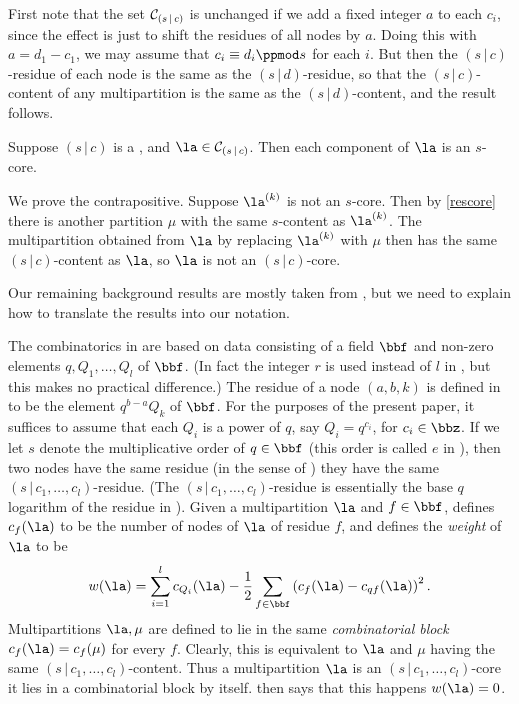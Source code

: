 \documentclass[a4paper, 11pt, twoside]{article}
\begin{document}
\begin{pf}
First note that the set $\mathcal{C}_{(s\,|\,c)}$ is unchanged if we add a fixed integer $a$ to each $c_i$, since the effect is just to shift the residues of all nodes by $a$. Doing this with $a=d_1-c_1$, we may assume that $c_i\equiv d_i\ppmod s$ for each $i$. But then the $(s\,|\,c)$-residue of each node is the same as the $(s\,|\,d)$-residue, so that the $(s\,|\,c)$-content of any multipartition is the same as the $(s\,|\,d)$-content, and the result follows.
\end{pf}

\begin{lemma}\label{multicore}
Suppose $(s\,|\,c)$ is a \mcd, and $\la\in\mc sc$. Then each component of $\la$ is an $s$-core.
\end{lemma}

\begin{pf}
We prove the contrapositive. Suppose $\cpt\la k$ is not an $s$-core. Then by \cref{rescore} there is another partition $\mu$ with the same $s$-content as $\cpt\la k$. The multipartition obtained from $\la$ by replacing $\cpt\la k$ with $\mu$ then has the same $(s\,|\,c)$-content as $\la$, so $\la$ is not an $(s\,|\,c)$-core.
\end{pf}

Our remaining background results are mostly taken from \cite{mfwt}, but we need to explain how to translate the results into our notation.

The combinatorics in \cite{mfwt} are based on data consisting of a field $\bbf$ and non-zero elements $q,Q_1,\dots,Q_l$ of $\bbf$. (In fact the integer $r$ is used instead of $l$ in \cite{mfwt}, but this makes no practical difference.) The residue of a node $(a,b,k)$ is defined in \cite{mfwt} to be the element $q^{b-a}Q_k$ of $\bbf$. For the purposes of the present paper, it suffices to assume that each $Q_i$ is a power of $q$, say $Q_i=q^{c_i}$, for $c_i\in\bbz$. If we let $s$ denote the multiplicative order of $q\in\bbf$ (this order is called $e$ in \cite{mfwt}), then two nodes have the same residue (in the sense of \cite{mfwt}) \iff they have the same $(s\,|\,c_1,\dots,c_l)$-residue. (The $(s\,|\,c_1,\dots,c_l)$-residue is essentially the base $q$ logarithm of the residue in \cite{mfwt}). Given a multipartition $\la$ and $f\in\bbf$, \cite{mfwt} defines $c_f(\la)$ to be the number of nodes of $\la$ of residue $f$, and defines the \emph{weight} of $\la$ to be
\[
w(\la)=\sum_{i=1}^lc_{Q_i}(\la)-\frac12\sum_{f\in\bbf}\left(c_f(\la)-c_{qf}(\la)\right)^2.
\]
Multipartitions $\la,\mu$ are defined to lie in the same \emph{combinatorial block} \iff $c_f(\la)=c_f(\mu)$ for every $f$. Clearly, this is equivalent to $\la$ and $\mu$ having the same $(s\,|\,c_1,\dots,c_l)$-content. Thus a multipartition $\la$ is an $(s\,|\,c_1,\dots,c_l)$-core \iff it lies in a combinatorial block by itself. \cite[Theorem 4.1]{mfwt} then says that this happens \iff $w(\la)=0$.
\end{document}
